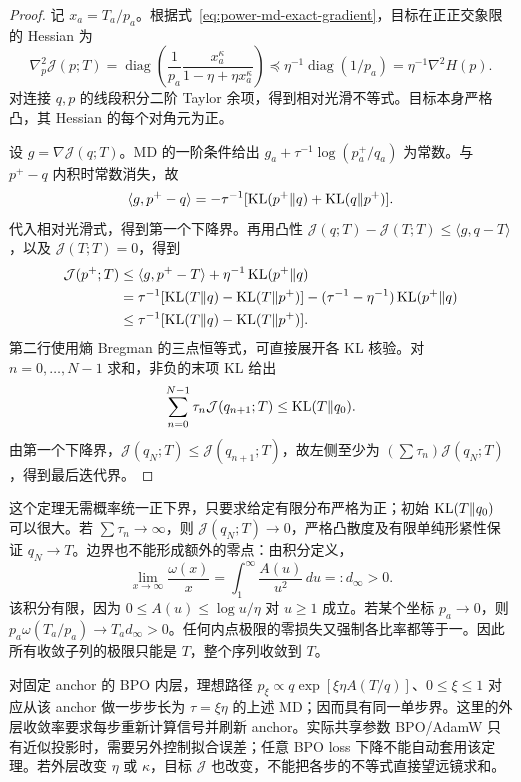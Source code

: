 \begin{proof}
记 $x_a=T_a/p_a$。根据式~\eqref{eq:power-md-exact-gradient}，目标在正正交象限的 Hessian 为
\begin{equation}
 \nabla_p^2\mathcal J(p;T)
 =\operatorname{diag}\left(\frac1{p_a}
       \frac{x_a^\kappa}{1-\eta+\eta x_a^\kappa}\right)
 \preceq\eta^{-1}\operatorname{diag}(1/p_a)
 =\eta^{-1}\nabla^2H(p).
 \label{eq:power-md-hessian-bound}
\end{equation}
对连接 $q,p$ 的线段积分二阶 Taylor 余项，得到相对光滑不等式。目标本身严格凸，其 Hessian 的每个对角元为正。

设 $g=\nabla\mathcal J(q;T)$。MD 的一阶条件给出 $g_a+\tau^{-1}\log(p_a^+/q_a)$ 为常数。与 $p^+-q$ 内积时常数消失，故
\begin{equation}
 \langle g,p^+-q\rangle
 =-\tau^{-1}[\operatorname{KL}(p^+\Vert q)+\operatorname{KL}(q\Vert p^+)].
\end{equation}
代入相对光滑式，得到第一个下降界。再用凸性 $\mathcal J(q;T)-\mathcal J(T;T)\le\langle g,q-T\rangle$，以及 $\mathcal J(T;T)=0$，得到
\begin{align}
 \mathcal J(p^+;T)
 &\le\langle g,p^+-T\rangle+\eta^{-1}\operatorname{KL}(p^+\Vert q)\\
 &=\tau^{-1}[\operatorname{KL}(T\Vert q)-\operatorname{KL}(T\Vert p^+)]
   -(\tau^{-1}-\eta^{-1})\operatorname{KL}(p^+\Vert q)\\
 &\le\tau^{-1}[\operatorname{KL}(T\Vert q)-\operatorname{KL}(T\Vert p^+)].
\end{align}
第二行使用熵 Bregman 的三点恒等式，可直接展开各 KL 核验。对 $n=0,\ldots,N-1$ 求和，非负的末项 KL 给出
\begin{equation}
 \sum_{n=0}^{N-1}\tau_n\mathcal J(q_{n+1};T)\le\operatorname{KL}(T\Vert q_0).
\end{equation}
由第一个下降界，$\mathcal J(q_N;T)\le\mathcal J(q_{n+1};T)$，故左侧至少为 $(\sum\tau_n)\mathcal J(q_N;T)$，得到最后迭代界。
\end{proof}

这个定理无需概率统一正下界，只要求给定有限分布严格为正；初始 $\operatorname{KL}(T\Vert q_0)$ 可以很大。若 $\sum\tau_n\to\infty$，则 $\mathcal J(q_N;T)\to0$，严格凸散度及有限单纯形紧性保证 $q_N\to T$。边界也不能形成额外的零点：由积分定义，
\begin{equation}
 \lim_{x\to\infty}\frac{\omega(x)}x
 =\int_1^\infty\frac{A(u)}{u^2}\,du=:d_\infty>0.
\end{equation}
该积分有限，因为 $0\le A(u)\le\log u/\eta$ 对 $u\ge1$ 成立。若某个坐标 $p_a\to0$，则 $p_a\omega(T_a/p_a)\to T_a d_\infty>0$。任何内点极限的零损失又强制各比率都等于一。因此所有收敛子列的极限只能是 $T$，整个序列收敛到 $T$。

对固定 anchor 的 BPO 内层，理想路径 $p_\xi\propto q\exp[\xi\eta A(T/q)]$、$0\le\xi\le1$ 对应从该 anchor 做一步步长为 $\tau=\xi\eta$ 的上述 MD；因而具有同一单步界。这里的外层收敛率要求每步重新计算信号并刷新 anchor。实际共享参数 BPO/AdamW 只有近似投影时，需要另外控制拟合误差；任意 BPO loss 下降不能自动套用该定理。若外层改变 $\eta$ 或 $\kappa$，目标 $\mathcal J$ 也改变，不能把各步的不等式直接望远镜求和。
